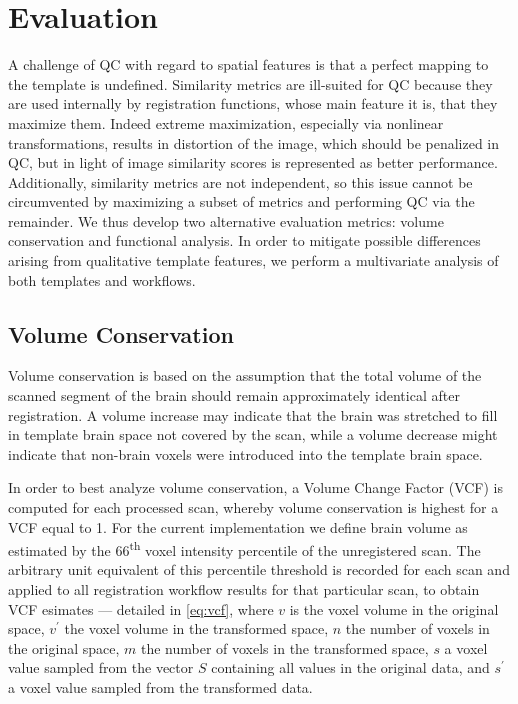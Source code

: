 \section{Evaluation}


A challenge of QC with regard to spatial features is that a perfect mapping to the template is undefined.
Similarity metrics are ill-suited for QC because they are used internally by registration functions, whose main feature it is, that they maximize them.
Indeed extreme maximization, especially via nonlinear transformations, results in distortion of the image, which should be penalized in QC, but in light of image similarity scores is represented as better performance.
Additionally, similarity metrics are not independent, so this issue cannot be circumvented by maximizing a subset of metrics and performing QC via the remainder.
We thus develop two alternative evaluation metrics: volume conservation and functional analysis.
In order to mitigate possible differences arising from qualitative template features, we perform a multivariate analysis of both templates and workflows.

\subsection{Volume Conservation}

Volume conservation is based on the assumption that the total volume of the scanned segment of the brain should remain approximately identical after registration.
A volume increase may indicate that the brain was stretched to fill in template brain space not covered by the scan, while a volume decrease might indicate that non-brain voxels were introduced into the template brain space.

In order to best analyze volume conservation, a Volume Change Factor (VCF) is computed for each processed scan, whereby volume conservation is highest for a VCF equal to 1.
For the current implementation we define brain volume as estimated by the 66\textsuperscript{th} voxel intensity percentile of the unregistered scan.
The arbitrary unit equivalent of this percentile threshold is recorded for each scan and applied to all registration workflow results for that particular scan, to obtain VCF esimates
 --- detailed in \cref{eq:vcf}, where $v$ is the voxel volume in the original space, $v^\prime$ the voxel volume in the transformed space, $n$ the number of voxels in the original space, $m$ the number of voxels in the transformed space, $s$ a voxel value sampled from the vector $S$ containing all values in the original data, and $s^\prime$ a voxel value sampled from the transformed data.

